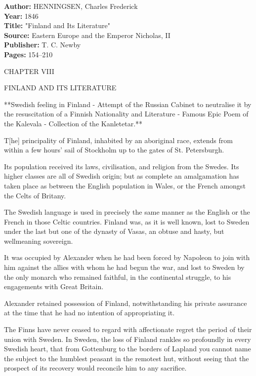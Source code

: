 \documentclass[11pt,a4paper]{article}
\begin{document}
\noindent
{\small
\textbf{Author:} HENNINGSEN, Charles Frederick\\
\textbf{Year:} 1846\\
\textbf{Title:} "Finland and Its Literature"\\
\textbf{Source:} Eastern Europe and the Emperor Nicholas, II\\
\textbf{Publisher:} T. C. Newby\\
\textbf{Pages:} 154--210
}

\vspace{1em}

CHAPTER VIII

FINLAND AND ITS LITERATURE

**Swedish feeling in Finland - Attempt of the Russian Cabinet to neutralise it by the resuscitation of a Finnish Nationality and Literature - Famous Epic Poem of the Kalevala - Collection of the Kanletetar.**

T[he] principality of Finland, inhabited by an aboriginal race, extends from within a few hours' sail of Stockholm up to the gates of St. Petersburgh.

Its population received its laws, civilisation, and religion from the Swedes. Its higher classes are all of Swedish origin; but as complete an amalgamation has taken place as between the English population in Wales, or the French amongst the Celts of Britany.

The Swedish language is used in precisely the same manner as the English or the French in those Celtic countries. Finland was, as it is well known, lost to Sweden under the last but one of the dynasty of Vasas, an obtuse and hasty, but wellmeaning sovereign.

It was occupied by Alexander when he had been forced by Napoleon to join with him against the allies with whom he had begun the war, and lost to Sweden by the only monarch who remained faithful, in the continental struggle, to his engagements with Great Britain.

Alexander retained possession of Finland, notwithstanding his private assurance at the time that he had no intention of appropriating it.

The Finns have never ceased to regard with affectionate regret the period of their union with Sweden. In Sweden, the loss of Finland rankles so profoundly in every Swedish heart, that from Gottenburg to the borders of Lapland you cannot name the subject to the humblest peasant in the remotest hut, without seeing that the prospect of its recovery would reconcile him to any sacrifice.
\end{document}
